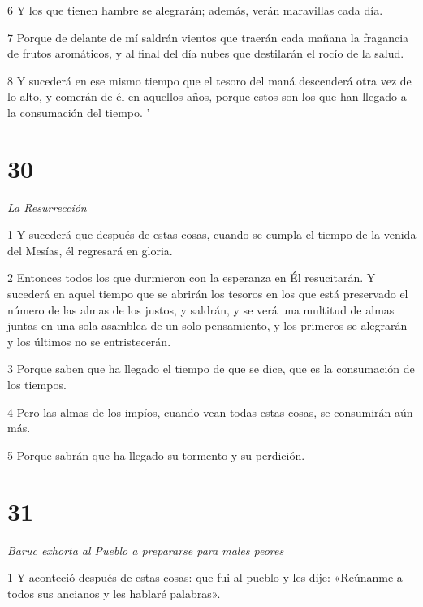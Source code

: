 \par 6 Y los que tienen hambre se alegrarán; además, verán maravillas cada día.

\par 7 Porque de delante de mí saldrán vientos que traerán cada mañana la fragancia de frutos aromáticos, y al final del día nubes que destilarán el rocío de la salud.

\par 8 Y sucederá en ese mismo tiempo que el tesoro del maná descenderá otra vez de lo alto, y comerán de él en aquellos años, porque estos son los que han llegado a la consumación del tiempo. '

\chapter{30}

\par \textit{La Resurrección}

\par 1 Y sucederá que después de estas cosas, cuando se cumpla el tiempo de la venida del Mesías, él regresará en gloria.

\par 2 Entonces todos los que durmieron con la esperanza en Él resucitarán. Y sucederá en aquel tiempo que se abrirán los tesoros en los que está preservado el número de las almas de los justos, y saldrán, y se verá una multitud de almas juntas en una sola asamblea de un solo pensamiento, y los primeros se alegrarán y los últimos no se entristecerán.

\par 3 Porque saben que ha llegado el tiempo de que se dice, que es la consumación de los tiempos.

\par 4 Pero las almas de los impíos, cuando vean todas estas cosas, se consumirán aún más.

\par 5 Porque sabrán que ha llegado su tormento y su perdición.

\chapter{31}

\par \textit{Baruc exhorta al Pueblo a prepararse para males peores}

\par 1 Y aconteció después de estas cosas: que fui al pueblo y les dije: «Reúnanme a todos sus ancianos y les hablaré palabras».

